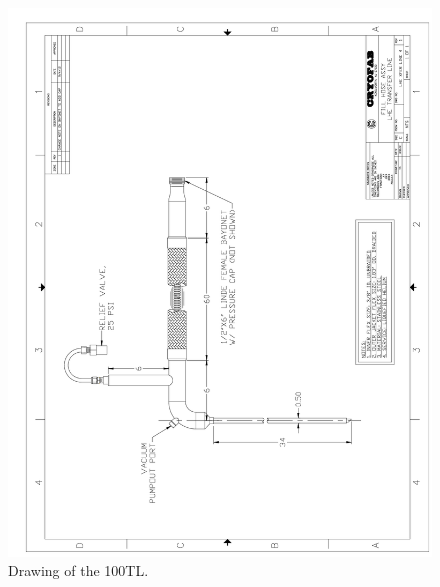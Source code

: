 \begin{appendices}
\begin{figure}[tbp!]
 \centering
 \includegraphics[width=\textwidth]{./img/100TL-drawing.png}
 \caption{Drawing of the 100TL.}
 \label{fig:100TL-drawing}
\end{figure}
\end{appendices}